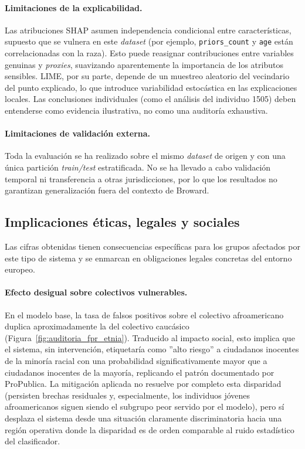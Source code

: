\documentclass[11pt,a4paper]{article}
\begin{document}
\paragraph{Limitaciones de la explicabilidad.} Las atribuciones SHAP asumen independencia condicional entre características, supuesto que se vulnera en este \textit{dataset} (por ejemplo, \texttt{priors\_count} y \texttt{age} están correlacionadas con la raza). Esto puede reasignar contribuciones entre variables genuinas y \textit{proxies}, suavizando aparentemente la importancia de los atributos sensibles. LIME, por su parte, depende de un muestreo aleatorio del vecindario del punto explicado, lo que introduce variabilidad estocástica en las explicaciones locales. Las conclusiones individuales (como el análisis del individuo 1505) deben entenderse como evidencia ilustrativa, no como una auditoría exhaustiva.

\paragraph{Limitaciones de validación externa.} Toda la evaluación se ha realizado sobre el mismo \textit{dataset} de origen y con una única partición \textit{train/test} estratificada. No se ha llevado a cabo validación temporal ni transferencia a otras jurisdicciones, por lo que los resultados no garantizan generalización fuera del contexto de Broward.

\subsection{Implicaciones éticas, legales y sociales}

Las cifras obtenidas tienen consecuencias específicas para los grupos afectados por este tipo de sistema y se enmarcan en obligaciones legales concretas del entorno europeo.

\paragraph{Efecto desigual sobre colectivos vulnerables.} En el modelo base, la tasa de falsos positivos sobre el colectivo afroamericano duplica aproximadamente la del colectivo caucásico (Figura~\ref{fig:auditoria_fpr_etnia}). Traducido al impacto social, esto implica que el sistema, sin intervención, etiquetaría como ''alto riesgo'' a ciudadanos inocentes de la minoría racial con una probabilidad significativamente mayor que a ciudadanos inocentes de la mayoría, replicando el patrón documentado por ProPublica. La mitigación aplicada no resuelve por completo esta disparidad (persisten brechas residuales y, especialmente, los individuos jóvenes afroamericanos siguen siendo el subgrupo peor servido por el modelo), pero sí desplaza el sistema desde una situación claramente discriminatoria hacia una región operativa donde la disparidad es de orden comparable al ruido estadístico del clasificador.
\end{document}

